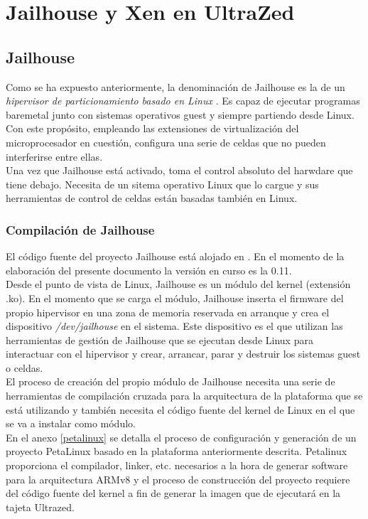 \chapter{Jailhouse y Xen en UltraZed}

\section{Jailhouse}
Como se ha expuesto anteriormente, la denominación de Jailhouse es la de un \textit{hipervisor de particionamiento basado en Linux} \cite{jailhouse_github}. Es capaz de ejecutar programas baremetal junto con sistemas operativos guest y siempre partiendo desde Linux. Con este propósito, empleando las extensiones de virtualización del microprocesador en cuestión, configura una serie de celdas que no pueden interferirse entre ellas.\\
Una vez que Jailhouse está activado, toma el control absoluto del harwdare que tiene debajo. Necesita de un sitema operativo Linux que lo cargue y sus herramientas de control de celdas están basadas también en Linux.

\subsection{Compilación de Jailhouse}
El código fuente del proyecto Jailhouse está alojado en \cite{jailhouse_github}. En el momento de la elaboración del presente documento la versión en curso es la 0.11.\\
Desde el punto de vista de Linux, Jailhouse es un módulo del kernel (extensión .ko). En el momento que se carga el módulo, Jailhouse inserta el firmware del propio hipervisor en una zona de memoria reservada en arranque y crea el dispositivo \textit{/dev/jailhouse} en el sistema. Este dispositivo es el que utilizan las herramientas de gestión de Jailhouse que se ejecutan desde Linux para interactuar con el hipervisor y crear, arrancar, parar y destruir los sistemas guest o celdas.\\

El proceso de creación del propio módulo de Jailhouse necesita una serie de herramientas de compilación cruzada para la arquitectura de la plataforma que se está utilizando y también necesita el código fuente del kernel de Linux en el que se va a instalar como módulo.\\
En el anexo \ref{petalinux} se detalla el proceso de configuración y generación de un proyecto PetaLinux basado en la plataforma anteriormente descrita. Petalinux proporciona el compilador, linker, etc. necesarios a la hora de generar software para la arquitectura ARMv8 y el proceso de construcción del proyecto requiere del código fuente del kernel a fin de generar la imagen que de ejecutará en la tajeta Ultrazed\texttrademark.\\

